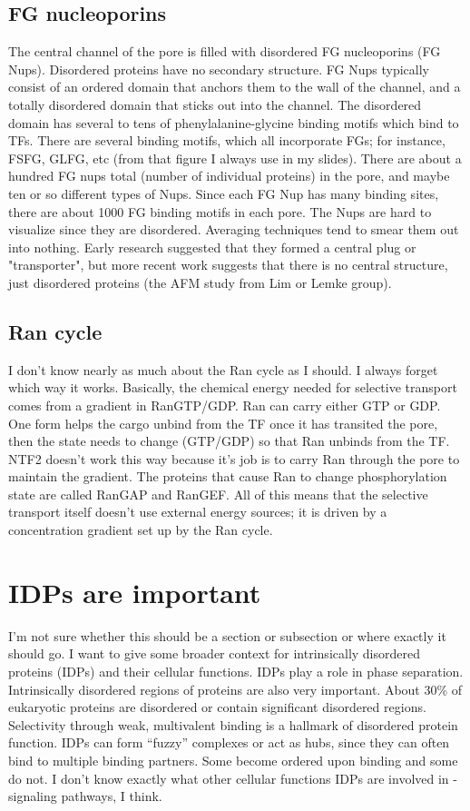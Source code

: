 \subsection{FG nucleoporins}
The central channel of the pore is filled with disordered FG nucleoporins (FG Nups).  Disordered proteins have no secondary structure.  FG Nups typically consist of an ordered domain that anchors them to the wall of the channel, and a totally disordered domain that sticks out into the channel.  The disordered domain has several to tens of phenylalanine-glycine binding motifs which bind to TFs.  There are several binding motifs, which all incorporate FGs; for instance, FSFG, GLFG, etc (from that figure I always use in my slides).  There are about a hundred FG nups total (number of individual proteins) in the pore, and maybe ten or so different types of Nups.  Since each FG Nup has many binding sites, there are about 1000 FG binding motifs in each pore.  The Nups are hard to visualize since they are disordered.  Averaging techniques tend to smear them out into nothing.  Early research suggested that they formed a central plug or "transporter", but more recent work suggests that there is no central structure, just disordered proteins (the AFM study from Lim or Lemke group).
\subsection{Ran cycle}
I don't know nearly as much about the Ran cycle as I should.  I always forget which way it works.  Basically, the chemical energy needed for selective transport comes from a gradient in RanGTP/GDP. Ran can carry either GTP or GDP.  One form helps the cargo unbind from the TF once it has transited the pore, then the state needs to change (GTP/GDP) so that Ran unbinds from the TF.  NTF2 doesn't work this way because it's job is to carry Ran through the pore to maintain the gradient.  The proteins that cause Ran to change phosphorylation state are called RanGAP and RanGEF.  All of this means that the selective transport itself doesn't use external energy sources; it is driven by a concentration gradient set up by the Ran cycle.
\section{IDPs are important}
I'm not sure whether this should be a section or subsection or where exactly it should go.  I want to give some broader context for intrinsically disordered proteins (IDPs) and their cellular functions.  IDPs play a role in phase separation.  Intrinsically disordered regions of proteins are also very important.  About 30\% of eukaryotic proteins are disordered or contain significant disordered regions.  Selectivity through weak, multivalent binding is a hallmark of disordered protein function.  IDPs can form ``fuzzy'' complexes or act as hubs, since they can often bind to multiple binding partners.  Some become ordered upon binding and some do not.  I don't know exactly what other cellular functions IDPs are involved in - signaling pathways, I think.
